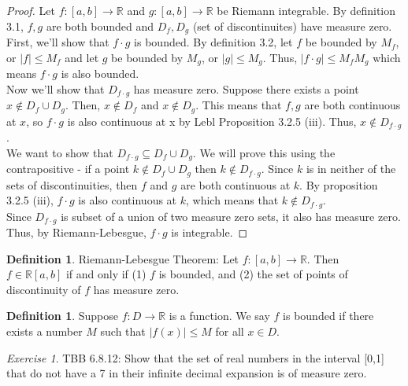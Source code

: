 \documentclass[12pt,oneside]{amsart}
\theoremstyle{definition}
\newtheorem{definition}[equation]{Definition}
\theoremstyle{remark}
\newtheorem{exer}{Exercise}
\numberwithin{equation}{exer}
\begin{document}
\begin{proof}
Let $f:[a,b]\rightarrow\mathbb{R}$ and $g:[a,b]\rightarrow\mathbb{R}$ be Riemann integrable. By definition 3.1, $f,g$ are both bounded and $D_f,D_g$ (set of discontinuites) have measure zero.\\
First, we'll show that $f\cdot g$ is bounded. By definition 3.2, let $f$ be bounded by $M_f$, or $|f|\leq M_f$ and let $g$ be bounded by $M_g$, or $|g|\leq M_g.$ Thus, $|f\cdot g|\leq M_fM_g$ which means $f\cdot g$ is also bounded.\\
Now we'll show that $D_{f\cdot g}$ has measure zero. Suppose there exists a point $x\notin D_f\cup D_g$. Then, $x\notin D_f$ and $x\notin D_g$. This means that $f,g$ are both continuous at $x$, so $f\cdot g$ is also continuous at x by Lebl Proposition 3.2.5 (iii). Thus, $x\notin D_{f\cdot g}$. \\
We want to show that $D_{f\cdot g}\subseteq D_f\cup D_g$. We will prove this using the contrapositive - if a point $k\notin D_f\cup D_g$ then $k\notin D_{f\cdot g}$. Since $k$ is in neither of the sets of discontinuities, then $f$ and $g$ are both continuous at $k$. By proposition 3.2.5 (iii), $f\cdot g$ is also continuous at $k$, which means that $k\notin D_{f\cdot g}$.  \\

Since $D_{f\cdot g}$ is subset of a union of two measure zero sets, it also has measure zero. Thus, by Riemann-Lebesgue, $f\cdot g$ is integrable.
\end{proof}
\begin{definition}
Riemann-Lebesgue Theorem: Let $f:[a,b]\rightarrow\mathbb{R}$. Then \\ $f\in\mathbb{R}[a,b]$ if and only if (1) $f$ is bounded, and (2) the set of points of discontinuity of $f$ has measure zero.
\end{definition}
\begin{definition}
Suppose $f:D\rightarrow\mathbb{R}$ is a function. We say $f$ is bounded if there exists a number $M$ such that $|f(x)|\leq M$ for all $x\in D$.
\end{definition}
\newpage
\begin{exer}
TBB 6.8.12: Show that the set of real numbers in the interval [0,1] that do not have a 7 in their infinite decimal expansion is of measure zero.
\end{exer}
\end{document}
